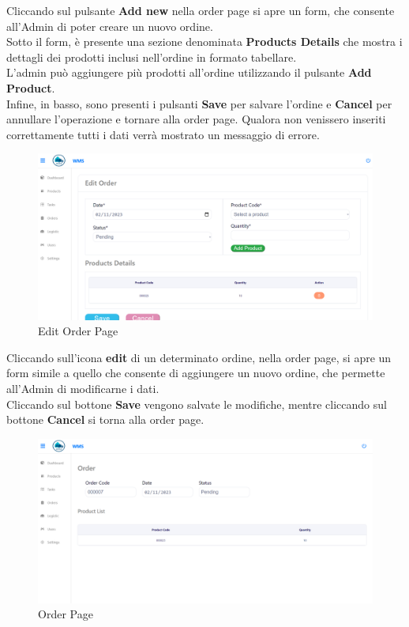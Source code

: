 Cliccando sul pulsante \textbf{Add new} nella order page si apre un form, che consente
all'Admin di poter creare un nuovo ordine.\\
Sotto il form, è presente una sezione denominata \textbf{Products Details} che mostra i dettagli dei prodotti inclusi
nell'ordine in formato tabellare.\\
L'admin può  aggiungere più prodotti all'ordine utilizzando il pulsante \textbf{Add Product}.\\
Infine, in basso, sono presenti i pulsanti \textbf{Save} per salvare l'ordine e \textbf{Cancel} per annullare l'operazione
e tornare alla order page.
Qualora non venissero inseriti correttamente tutti i dati verrà mostrato un messaggio di errore.

\begin{figure}[H]
    \centering
    \includegraphics[width=\textwidth]{document/sections/img/Storyboard/editOrderPage.png}
    \caption{Edit Order Page}
    \label{fig:editOrderPage}
\end{figure}

Cliccando sull'icona \textbf{edit} di un determinato ordine, nella order page, si apre un form simile a quello che
consente di aggiungere un nuovo ordine, che permette all'Admin di modificarne i dati.\\
Cliccando sul bottone \textbf{Save} vengono salvate le modifiche, mentre cliccando sul bottone \textbf{Cancel} si torna alla order page.

\begin{figure}[H]
    \centering
    \includegraphics[width=\textwidth]{document/sections/img/Storyboard/viewOrder.png}
    \caption{Order Page}
    \label{fig:viewOrdersPage}
\end{figure}


